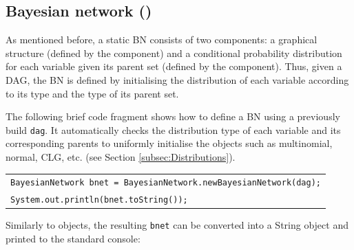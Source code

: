 \subsection{Bayesian network ()}

As mentioned before, a static BN consists of two components: a graphical structure (defined by the  component) and a conditional probability distribution for each variable given its parent set (defined by the  component). Thus, given a DAG, the BN is defined by initialising the distribution of each variable according to its type and the type of its parent set.

The following brief code fragment shows how to define a BN using a previously build \texttt{dag}. It automatically checks the distribution type of each variable and its corresponding parents to uniformly initialise the  objects such as multinomial, normal, CLG, etc. (see Section \ref{subsec:Distributions}).


\begin{table}[H]
\begin{tabular}{l} \hline  
        \texttt{BayesianNetwork bnet = BayesianNetwork.newBayesianNetwork(dag);}\\ 
        \texttt{System.out.println(bnet.toString());}\\ \hline 
\end{tabular}
\end{table}      

Similarly to  objects, the resulting \texttt{bnet} can be converted into a String object and printed to the standard console:

